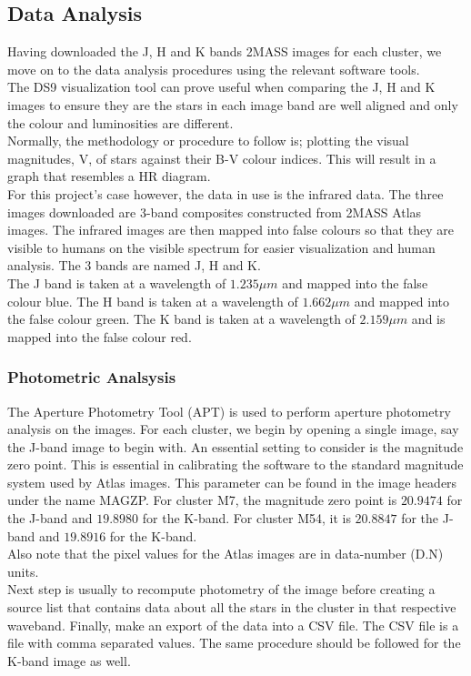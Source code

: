 \documentclass[12pt]{article}
\begin{document}
		\subsection{Data Analysis}
		Having downloaded the J, H and K bands 2MASS images for each cluster, we move on to the data analysis procedures using the relevant software tools.\\
		The DS9 visualization tool can prove useful when comparing the J, H and K images to ensure they are the stars in each image band are well aligned and only the colour and luminosities are different.\\
		Normally, the methodology or procedure to follow is; plotting the visual magnitudes, V, of stars against their B-V colour indices. This will result in a graph that resembles a HR diagram.\\
		For this project's case however, the data in use is the infrared data. The three images downloaded are 3-band composites constructed from 2MASS Atlas images. The infrared images are then mapped into false colours so that they are visible to humans on the visible spectrum for easier visualization and human analysis. The 3 bands are named J, H and K.\\
		The J band is taken at a wavelength of $1.235\mu m$ and mapped into the false colour blue. The H band is taken at a wavelength of $1.662\mu m$ and mapped into the false colour green. The K band is taken at a wavelength of $2.159\mu m$ and is mapped into the false colour red.\\
		\subsubsection{Photometric Analsysis}
		The Aperture Photometry Tool (APT) is used to perform aperture photometry analysis on the images. For each cluster, we begin by opening a single image, say the J-band image to begin with. An essential setting to consider is the magnitude zero point. This is essential in calibrating the software to the standard magnitude system used by Atlas images. This parameter can be found in the image headers under the name MAGZP. For cluster M7, the magnitude zero point is $20.9474$ for the J-band and $19.8980$ for the K-band. For cluster M54, it is $20.8847$ for the J-band and $19.8916$ for the K-band.\\
		Also note that the pixel values for the Atlas images are in data-number (D.N) units.\\
		Next step is usually to recompute photometry of the image before creating a source list that contains data about all the stars in the cluster in that respective waveband. Finally, make an export of the data into a CSV file. The CSV file is a file with comma separated values. The same procedure should be followed for the K-band image as well.
\end{document}
